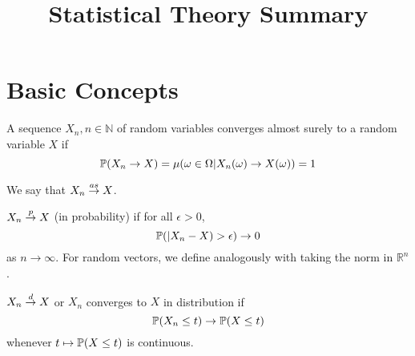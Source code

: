 

\title{Statistical Theory Summary}



\maketitle

\section{Basic Concepts}

\begin{defn}
  A sequence $X_{n}, n \in \mathbb{N}$ of random variables converges
  almost surely to a random variable $X$ if
  \begin{equation}
    \label{eq:4}
    \Prob{X_{n} \rightarrow X} = \mu(\omega \in \Omega | X_{n}(\omega)
    \rightarrow X(\omega)) = 1
  \end{equation}

  We say that $X_{n} \overset{as}{\rightarrow} X$.
\end{defn}

\begin{defn}
  $X_{n} \overset{p}{\rightarrow} X$ (in probability) if for all $\epsilon > 0$,
  \begin{equation}
    \label{eq:5}
    \Prob{|X_{n} - X} > \epsilon) \rightarrow 0
  \end{equation} as $n \rightarrow \infty$.
  For random vectors, we define analogously with taking the norm in
  $\mathbb{R}^{n}$. 
\end{defn}

\begin{defn}
  $X_{n} \overset{d}{\rightarrow} X$ or $X_{n}$ converges to $X$ in distribution if
  \begin{equation}
    \label{eq:6}
    \Prob{X_{n} \leq t} \rightarrow \Prob{X \leq t}
  \end{equation} whenever $t \mapsto \Prob{X \leq t}$ is continuous.
\end{defn}

